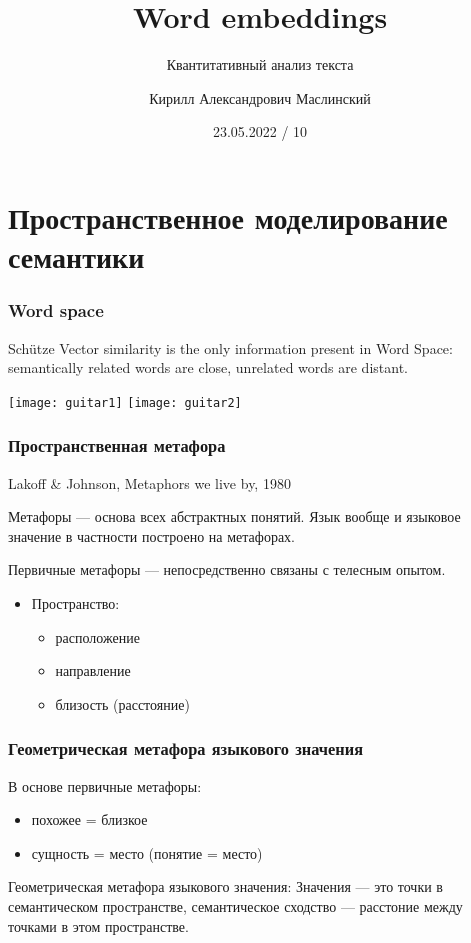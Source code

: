 \documentclass[10pt,svgnames]{beamer}
\title[QTA 10] %
{Word embeddings}
\subtitle
{Квантитативный анализ текста} %
\author%
{Кирилл Александрович Маслинский}
\institute%
{НИУ ВШЭ Санкт-Петербург}
\date%
{23.05.2022 / 10}
\begin{document}
\begin{frame}
  \titlepage
\end{frame}

\section{Пространственное моделирование семантики}


\begin{frame}
  \frametitle{Word space}
  \begin{block}{Sch\"utze}
    Vector similarity is the only information present in Word Space:
    semantically related words are close, unrelated words are
    distant.
  \end{block}
  \texttt{[image: guitar1]}
  \texttt{[image: guitar2]}
\end{frame}

\begin{frame}
  \frametitle{Пространственная метафора}
  Lakoff \& Johnson, Metaphors we live by, 1980

  Метафоры — основа всех абстрактных понятий. Язык вообще и языковое
  значение в частности построено на метафорах. 

  Первичные метафоры — непосредственно связаны с телесным опытом.
  \begin{itemize}
  \item Пространство:
    \begin{itemize}
    \item расположение
    \item направление
    \item близость (расстояние)
    \end{itemize}
  \end{itemize}
\end{frame}

\begin{frame}
  \frametitle{Геометрическая метафора языкового значения}
  В основе первичные метафоры:
  \begin{itemize}
  \item похожее = близкое
  \item сущность = место (понятие = место)
  \end{itemize}
  \begin{block}{Геометрическая метафора языкового значения:}
    Значения — это точки в семантическом пространстве, семантическое
    сходство — расстоние между точками в этом пространстве.
  \end{block}
\end{frame}
\end{document}
